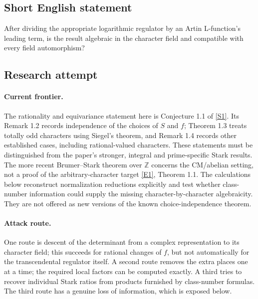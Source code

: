\documentclass[11pt,a4paper]{article}
\newcommand{\Z}{\mathbb{Z}}
\newcommand{\sref}[2]{\hyperlink{source:#1:#2}{[S#2]}}
\newcommand{\eref}[2]{\hyperlink{extra:#1:#2}{[E#2]}}
\numberwithin{equation}{section}
\begin{document}
\subsection{Short English statement}
After dividing the appropriate logarithmic regulator by an Artin L-function's leading term, is the result algebraic in the character field and compatible with every field automorphism?
\subsection{Research attempt}

\paragraph{Current frontier.}
The rationality and equivariance statement here is Conjecture 1.1 of
\sref{30006764}{1}. Its Remark 1.2 records independence of the choices of $S$
and $f$; Theorem 1.3 treats totally odd characters using Siegel's theorem,
and Remark 1.4 records other established cases, including rational-valued
characters. These statements must be distinguished from the paper's
stronger, integral and prime-specific Stark results. The more recent
Brumer--Stark theorem over $\Z$ concerns the CM/abelian setting, not a
proof of the arbitrary-character target \eref{30006764}{1}, Theorem 1.1.
The calculations below reconstruct normalization reductions explicitly
and test whether class-number information could supply the missing
character-by-character algebraicity. They are not offered as new
versions of the known choice-independence theorem.

\paragraph{Attack route.}
One route is descent of the determinant from a complex representation
to its character field; this succeeds for rational changes of $f$, but
not automatically for the transcendental regulator itself. A second
route removes the extra places one at a time; the required local
factors can be computed exactly. A third tries to recover individual
Stark ratios from products furnished by class-number formulas. The
third route has a genuine loss of information, which is exposed below.
\end{document}
